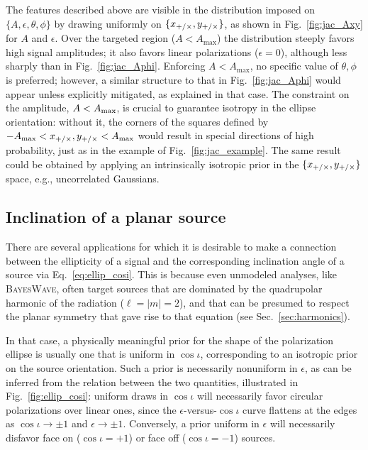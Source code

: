 \documentclass[aps,prd,twocolumn,superscriptaddress,preprintnumbers,floatfix,nofootinbib]{revtex4-2}
\newcommand*{\eq}[1]{Eq.~\eqref{eq:#1}}
\begin{document}
The features described above are visible in the distribution imposed on $\{A,\epsilon,\theta,\phi\}$ by drawing uniformly on $\{x_{+/\times}, y_{+/\times}\}$, as shown in Fig.~\ref{fig:jac_Axy} for $A$ and $\epsilon$.
Over the targeted region ($A < A_{\max}$) the distribution steeply favors high signal amplitudes; it also favors linear polarizations ($\epsilon = 0$), although less sharply than in Fig.~\ref{fig:jac_Aphi}.
Enforcing $A < A_{\max}$, no specific value of $\theta, \phi$ is preferred; however, a similar structure to that in Fig.~\ref{fig:jac_Aphi} would appear unless explicitly mitigated, as explained in that case.
The constraint on the amplitude, $A < A_{\rm max}$, is crucial to guarantee isotropy in the ellipse orientation: without it, the corners of the squares defined by $-A_{\max} < x_{+/\times},y_{+/\times} < A_{\max}$ would result in special directions of high probability, just as in the example of Fig.~\ref{fig:jac_example}.
The same result could be obtained by applying an intrinsically isotropic prior in the $\{x_{+/\times}, y_{+/\times}\}$ space, e.g., uncorrelated Gaussians.

\subsection{Inclination of a planar source}
\label{sec:jac:cosi}

There are several applications for which it is desirable to make a connection between the ellipticity of a signal and the corresponding inclination angle of a source via \eq{ellip_cosi}.
This is because even unmodeled analyses, like \textsc{BayesWave}, often target sources that are dominated by the quadrupolar harmonic of the radiation ($\ell=|m|=2$), and that can be presumed to respect the planar symmetry that gave rise to that equation (see Sec.~\ref{sec:harmonics}).

In that case, a physically meaningful prior for the shape of the polarization ellipse is usually one that is uniform in $\cos\iota$, corresponding to an isotropic prior on the source orientation.
Such a prior is necessarily nonuniform in $\epsilon$, as can be inferred from the relation between the two quantities, illustrated in Fig.~\ref{fig:ellip_cosi}: uniform draws in $\cos\iota$ will necessarily favor circular polarizations over linear ones, since the $\epsilon$-versus-$\cos\iota$ curve flattens at the edges as $\cos\iota\to\pm 1$ and $\epsilon \to \pm 1$.
Conversely, a prior uniform in $\epsilon$ will necessarily disfavor face on ($\cos\iota=+1$) or face off ($\cos\iota=-1$) sources.
\end{document}

